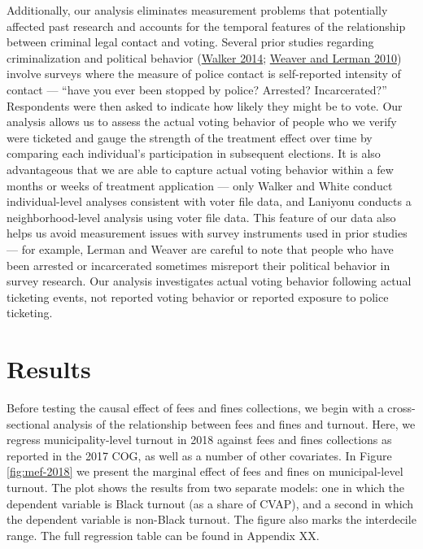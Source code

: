 \documentclass[
  12pt,
]{article}
\begin{document}
Additionally, our analysis eliminates measurement problems that potentially affected past research and accounts for the temporal features of the relationship between criminal legal contact and voting. Several prior studies regarding criminalization and political behavior (\protect\hyperlink{ref-Walker2014}{Walker 2014}; \protect\hyperlink{ref-Weaver2010}{Weaver and Lerman 2010}) involve surveys where the measure of police contact is self-reported intensity of contact --- ``have you ever been stopped by police? Arrested? Incarcerated?'' Respondents were then asked to indicate how likely they might be to vote. Our analysis allows us to assess the actual voting behavior of people who we verify were ticketed and gauge the strength of the treatment effect over time by comparing each individual's participation in subsequent elections. It is also advantageous that we are able to capture actual voting behavior within a few months or weeks of treatment application --- only Walker and White conduct individual-level analyses consistent with voter file data, and Laniyonu conducts a neighborhood-level analysis using voter file data. This feature of our data also helps us avoid measurement issues with survey instruments used in prior studies --- for example, Lerman and Weaver are careful to note that people who have been arrested or incarcerated sometimes misreport their political behavior in survey research. Our analysis investigates actual voting behavior following actual ticketing events, not reported voting behavior or reported exposure to police ticketing.

\hypertarget{results}{%
\section*{Results}\label{results}}

Before testing the causal effect of fees and fines collections, we begin with a cross-sectional analysis of the relationship between fees and fines and turnout. Here, we regress municipality-level turnout in 2018 against fees and fines collections as reported in the 2017 COG, as well as a number of other covariates. In Figure \ref{fig:mef-2018} we present the marginal effect of fees and fines on municipal-level turnout. The plot shows the results from two separate models: one in which the dependent variable is Black turnout (as a share of CVAP), and a second in which the dependent variable is non-Black turnout. The figure also marks the interdecile range. The full regression table can be found in Appendix XX.
\end{document}
